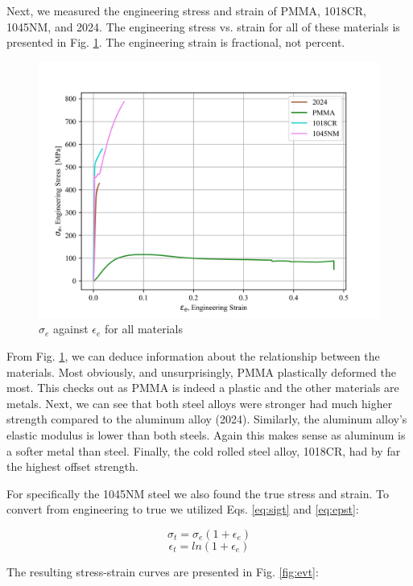 \documentclass{article}
\begin{document}
Next, we measured the engineering stress and strain of PMMA, 1018CR, 1045NM, and 2024. The engineering stress vs. strain for all of these materials is presented in Fig. \ref{fig:q3all}. The engineering strain is fractional, not percent. 

\begin{figure}[!h!]
    \centering
    \includegraphics[width=0.7\linewidth]{plots/q3_all.png}
    \caption{$\sigma_e$ against $\epsilon_e$ for all materials}
    \label{fig:q3all}
\end{figure}
\newpage
From Fig. \ref{fig:q3all}, we can deduce information about the relationship between the materials. Most obviously, and unsurprisingly, PMMA plastically deformed the most. This checks out as PMMA is indeed a plastic and the other materials are metals. Next, we can see that both steel alloys were stronger had much higher strength compared to the aluminum alloy (2024). Similarly, the aluminum alloy's elastic modulus is lower than both steels. Again this makes sense as aluminum is a softer metal than steel. Finally, the cold rolled steel alloy, 1018CR, had by far the highest offset strength. 

For specifically the 1045NM steel we also found the true stress and strain. To convert from engineering to true we utilized Eqs. \ref{eq:sigt} and \ref{eq:epst}:

\begin{equation}
    \sigma_t = \sigma_e \left(1+\epsilon_e\right)
    \label{eq:sigt}
\end{equation}
\begin{equation}
    \epsilon_t = ln\left( 1 + \epsilon_e\right)
    \label{eq:epst}
\end{equation}

\noindent
The resulting stress-strain curves are presented in Fig. \ref{fig:evt}:
\end{document}

